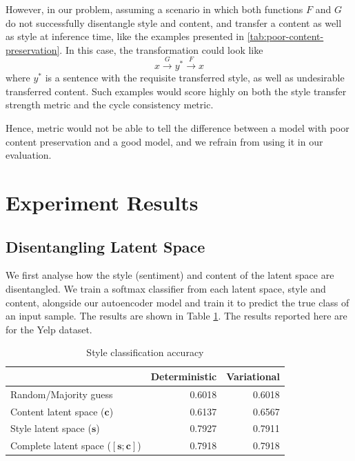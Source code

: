 However, in our problem, assuming a scenario in which both functions $F$ and $G$ do not successfully disentangle style and content, and transfer a content as well as style at inference time, like the examples presented in \ref{tab:poor-content-preservation}. In this case, the transformation could look like
\begin{equation*}
	x \xrightarrow{G} y^* \xrightarrow{F} x
\end{equation*}
where $y^*$ is a sentence with the requisite transferred style, as well as undesirable transferred content. Such examples would score highly on both the style transfer strength metric and the cycle consistency metric.

Hence, metric would not be able to tell the difference between a model with poor content preservation and a good model, and we refrain from using it in our evaluation.


\section{Experiment Results}

\subsection{Disentangling Latent Space}

We first analyse how the style (sentiment) and content of the latent space are disentangled. We train a softmax classifier from each latent space, style and content, alongside our autoencoder model and train it to predict the true class of an input sample. The results are shown in Table \ref{tab:latent-space-classification}. The results reported here are for the Yelp dataset.

\begin{table}[ht]
	\centering
	\begin{tabular}{| l | r | r |}
		\hline
		                                        & \textbf{Deterministic} & \textbf{Variational} \\
		\hline \hline
		Random/Majority guess                   & 0.6018                 & 0.6018               \\ \hline \hline
		Content latent space  ($\bm c$)         & 0.6137                 & 0.6567               \\ \hline
		Style latent space ($\bm s$)            & 0.7927                 & 0.7911               \\ \hline
		Complete latent space ($[\bm s;\bm c]$) & 0.7918                 & 0.7918               \\
		\hline
	\end{tabular}
	\caption{Style classification accuracy}
	\label{tab:latent-space-classification}
\end{table}

